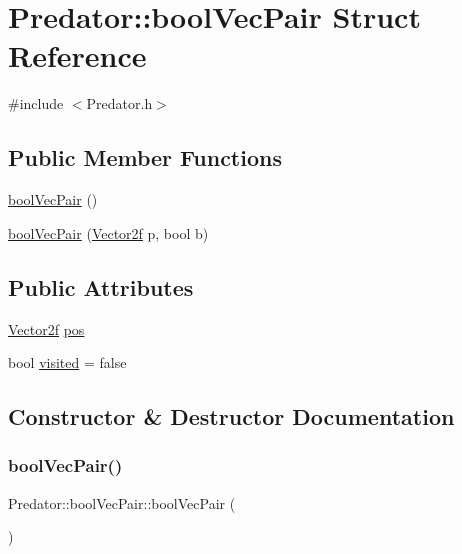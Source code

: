\hypertarget{struct_predator_1_1bool_vec_pair}{}\section{Predator\+::bool\+Vec\+Pair Struct Reference}
\label{struct_predator_1_1bool_vec_pair}


{\ttfamily \#include $<$Predator.\+h$>$}

\subsection*{Public Member Functions}
\begin{DoxyCompactItemize}
\item 
\mbox{\hyperlink{struct_predator_1_1bool_vec_pair_a1e18af0b2ae8d0aa2621663e27383717}{bool\+Vec\+Pair}} ()
\item 
\mbox{\hyperlink{struct_predator_1_1bool_vec_pair_a88e6533da82d617911adaa137711f954}{bool\+Vec\+Pair}} (\mbox{\hyperlink{class_vector2f}{Vector2f}} p, bool b)
\end{DoxyCompactItemize}
\subsection*{Public Attributes}
\begin{DoxyCompactItemize}
\item 
\mbox{\hyperlink{class_vector2f}{Vector2f}} \mbox{\hyperlink{struct_predator_1_1bool_vec_pair_a9a60ae55f2b32cb24460122ec03386f0}{pos}}
\item 
bool \mbox{\hyperlink{struct_predator_1_1bool_vec_pair_ab8fb68ccbeae03dc1eef4563d16dcb78}{visited}} = false
\end{DoxyCompactItemize}


\subsection{Constructor \& Destructor Documentation}
\mbox{\label{struct_predator_1_1bool_vec_pair_a1e18af0b2ae8d0aa2621663e27383717}} 
\subsubsection{\texorpdfstring{boolVecPair()}{boolVecPair()}\hspace{0.1cm}{\footnotesize\ttfamily [1/2]}}
{\footnotesize\ttfamily Predator\+::bool\+Vec\+Pair\+::bool\+Vec\+Pair (\begin{DoxyParamCaption}{ }\end{DoxyParamCaption})\hspace{0.3cm}{\ttfamily [inline]}}


